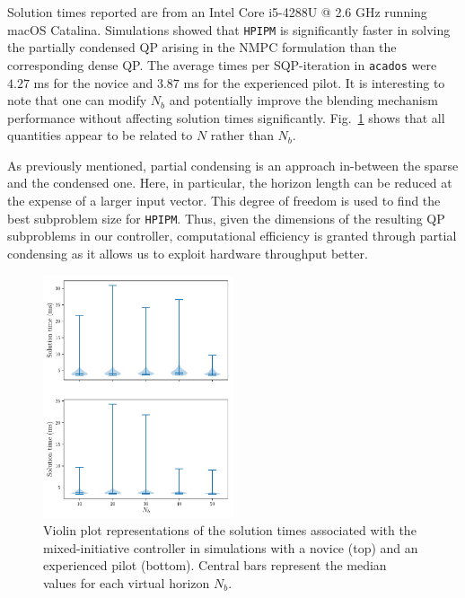 Solution times reported are from an Intel Core i5-4288U @ 2.6 GHz running macOS Catalina. Simulations showed that \texttt{HPIPM} is significantly faster in solving the partially condensed QP arising in the NMPC formulation than the corresponding dense QP. The average times per SQP-iteration in \texttt{acados} were $4.27$ ms for the novice and $3.87$ ms for the experienced pilot. It is interesting to note that one can modify $N_b$ and potentially improve the blending mechanism performance without affecting solution times significantly. Fig.~\ref{fig:violin} shows that all quantities appear to be related to $N$ rather than $N_b$.

As previously mentioned, partial condensing is an approach in-between the sparse and the condensed one. Here, in particular, the horizon length can be reduced at the expense of a larger input vector. This degree of freedom is used to find the best subproblem size for \texttt{HPIPM}. Thus, given the dimensions of the resulting QP subproblems in our controller, computational efficiency is granted through partial condensing as it allows us to exploit hardware throughput better.

\begin{figure}[t]
	\includegraphics[width=0.5\textwidth]{figures/violin}
	\vspace{-0.8cm}
	\caption{Violin plot representations of the solution times associated with the mixed-initiative controller in simulations with a novice (top) and an experienced pilot (bottom). Central bars represent the median values for each virtual horizon $N_b$.}\label{fig:violin}
\end{figure}
